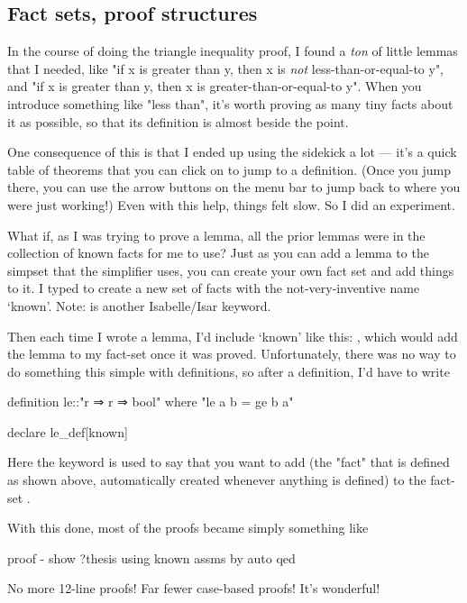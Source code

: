 \subsection{Fact sets, proof structures}
In the course of doing the triangle inequality proof, I found a \textit{ton} of little lemmas that I needed, like "if x is greater than y, then x is \textit{not} less-than-or-equal-to y", and "if x is greater than y, then x is greater-than-or-equal-to y". When you introduce something like "less than", it's worth proving as many tiny facts about it as possible, so that its definition is almost beside the point. 

One consequence of this is that I ended up using the sidekick a lot --- it's a quick table of theorems that you can click on to jump to a definition. (Once you jump there, you can use the arrow buttons on the menu bar to jump back to where you were just working!) Even with this help, things felt slow. So I did an experiment. 

What if, as I was trying to prove a lemma, all the prior lemmas were in the collection of known facts for me to use? Just as you can add a lemma to the simpset that the simplifier uses, you can create your own fact set and add things to it. I typed  to create a new set of facts with the not-very-inventive name `known'. Note:  is another Isabelle/Isar keyword. 

Then each time I wrote a lemma, I'd include `known' like this: , which would add the lemma  to my fact-set once it was proved. Unfortunately, there was no way to do something this simple with definitions, so after a definition, I'd have to write
\begin{IS}
definition le::"r ⇒ r ⇒ bool"
  where "le a b = ge b a" 

declare le_def[known]
\end{IS}
Here the keyword  is used to say that you want to add  (the "fact" that  is defined as shown above, automatically created whenever anything is defined) to the fact-set . 

With this done, most of the proofs became simply something like
\begin{IS}
proof -
  show ?thesis using known assms by auto
qed
\end{IS}
No more 12-line proofs! Far fewer case-based proofs! It's wonderful! 

